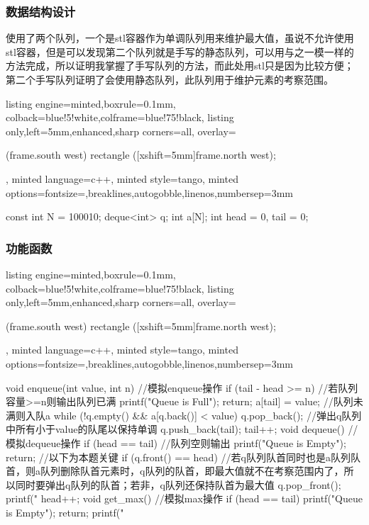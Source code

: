 \documentclass[12pt]{article}
\begin{document}
\subsubsection{数据结构设计}
{\songti 使用了两个队列，一个是stl容器作为单调队列用来维护最大值，虽说不允许使用stl容器，但是可以发现第二个队列就是手写的静态队列，可以用与之一模一样的方法完成，所以证明我掌握了手写队列的方法，而此处用stl只是因为比较方便；第二个手写队列证明了会使用静态队列，此队列用于维护元素的考察范围。}
\begin{tcblisting}{listing engine=minted,boxrule=0.1mm,
colback=blue!5!white,colframe=blue!75!black,
listing only,left=5mm,enhanced,sharp corners=all,
overlay={\begin{tcbclipinterior} (frame.south west)
rectangle ([xshift=5mm]frame.north west);\end{tcbclipinterior}},
minted language=c++,
minted style=tango,
minted options={fontsize=\small,breaklines,autogobble,linenos,numbersep=3mm}}
const int N = 100010;
deque<int> q;
int a[N];
int head = 0, tail = 0;
\end{tcblisting}
\subsubsection{功能函数}
\begin{tcblisting}{listing engine=minted,boxrule=0.1mm,
colback=blue!5!white,colframe=blue!75!black,
listing only,left=5mm,enhanced,sharp corners=all,
overlay={\begin{tcbclipinterior} (frame.south west)
rectangle ([xshift=5mm]frame.north west);\end{tcbclipinterior}},
minted language=c++,
minted style=tango,
minted options={fontsize=\small,breaklines,autogobble,linenos,numbersep=3mm}}
void enqueue(int value, int n) { //模拟enqueue操作
    if (tail - head >= n) { //若队列容量>=n则输出队列已满
        printf("Queue is Full\n");
        return;
    }
    a[tail] = value; //队列未满则入队a
    while (!q.empty() && a[q.back()] < value) {
        q.pop_back(); //弹出q队列中所有小于value的队尾以保持单调
    }
    q.push_back(tail);
    tail++;
}
void dequeue() { //模拟dequeue操作
    if (head == tail) { //队列空则输出
        printf("Queue is Empty\n");
        return;
    }  //以下为本题关键
    if (q.front() == head) { //若q队列队首同时也是a队列队首，则a队列删除队首元素时，q队列的队首，即最大值就不在考察范围内了，所以同时要弹出q队列的队首；若非，q队列还保持队首为最大值
        q.pop_front();
    }
    printf("%
    head++;
}
void get_max() { //模拟max操作
    if (head == tail) {
        printf("Queue is Empty\n");
        return;
    }
    printf("%
}
\end{tcblisting}
\end{document}
